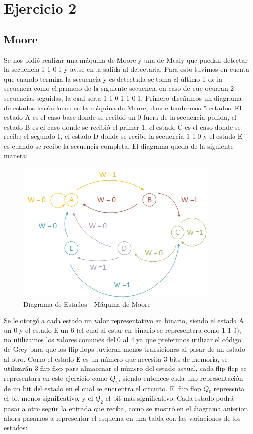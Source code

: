 \documentclass[10pt,a4paper]{article}
\begin{document}
\section*{Ejercicio 2}

\subsection*{Moore}
Se nos pidi\'o realizar una m\'aquina de Moore y una de Mealy que puedan detectar la secuencia 1-1-0-1 y avise en la salida al detectarla. Para esto tuvimos en cuenta que cuando termina la secuencia y es detectada se toma el \'ultimo 1 de la secuencia como el primero de la siguiente secuencia en caso de que ocurran 2 secuencias seguidas, la cual ser\'ia 1-1-0-1-1-0-1. Primero diseñamos un diagrama de estados basándonos en la m\'aquina de Moore, donde tendremos 5 estados. El estado A es el caso base donde se recibió un 0 fuera de la secuencia pedida, el estado B es el caso donde se recibió el primer 1, el estado C es el caso donde se recibe el segundo 1, el estado D donde se recibe la secuencia 1-1-0 y el estado E es cuando se recibe la secuencia completa. 
El diagrama queda de la siguiente manera:

\begin{figure}[hbtp]
	\centering
		\includegraphics[scale=1]{Imagenes/diagestmoore.jpg}
	\caption{Diagrama de Estados - Máquina de Moore}
	\label{2_fig0}
\end{figure}

Se le otorgó a cada estado un valor representativo en binario, siendo el estado A un 0 y el estado E un 6 (el cual al estar en binario se representara como 1-1-0), no utilizamos los valores comunes del 0 al 4 ya que preferimos utilizar el código de Grey para que los flip flops tuvieran menos transiciones al pasar de un estado al otro. Como el estado E es un número que necesita 3 bits de memoria, se utilizar\'an 3 flip flop para almacenar el número del estado actual, cada flip flop se representar\'a en este ejercicio como $Q_n$, siendo entonces cada uno representación de un bit del estado en el cual se encuentra el circuito. El flip flop $Q_0$ representa el bit menos significativo, y el $Q_2$ el bit más significativo. Cada estado podr\'a pasar a otro seg\'un la entrada que reciba, como se mostró en el diagrama anterior, ahora pasamos a representar el esquema en una tabla con las variaciones de los estados:
\end{document}
